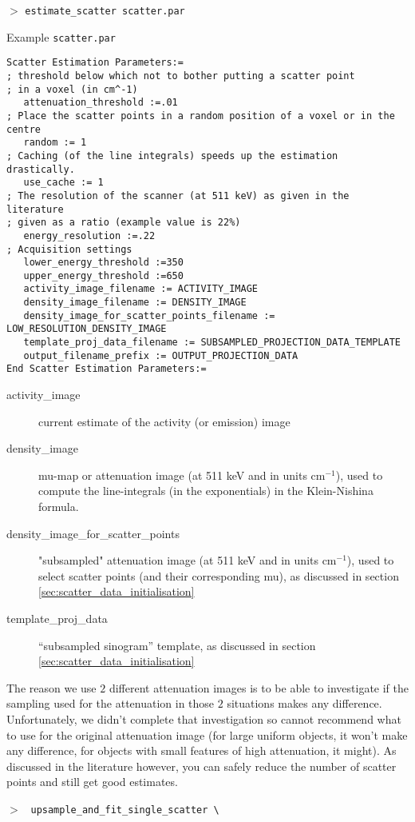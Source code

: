 \documentclass{article}
\newcommand{\cmdline}[1]{\par \noindent $>$ \texttt{#1}\par}
\begin{document}
{\cmdline{estimate\_scatter scatter.par}
Example \texttt{scatter.par}
\begin{verbatim}
Scatter Estimation Parameters:=
; threshold below which not to bother putting a scatter point
; in a voxel (in cm^-1)
   attenuation_threshold :=.01
; Place the scatter points in a random position of a voxel or in the centre
   random := 1
; Caching (of the line integrals) speeds up the estimation drastically.
   use_cache := 1
; The resolution of the scanner (at 511 keV) as given in the literature
; given as a ratio (example value is 22%)
   energy_resolution :=.22
; Acquisition settings
   lower_energy_threshold :=350
   upper_energy_threshold :=650
   activity_image_filename := ACTIVITY_IMAGE
   density_image_filename := DENSITY_IMAGE
   density_image_for_scatter_points_filename := LOW_RESOLUTION_DENSITY_IMAGE
   template_proj_data_filename := SUBSAMPLED_PROJECTION_DATA_TEMPLATE
   output_filename_prefix := OUTPUT_PROJECTION_DATA
End Scatter Estimation Parameters:=
\end{verbatim}
\begin{description}
\item[activity\_image]
current estimate of the activity (or emission) image
\item[density\_image] mu-map or attenuation image (at 511 keV and in units cm$^{-1}$),
used to compute the line-integrals (in the exponentials) in the Klein-Nishina formula.
\item[density\_image\_for\_scatter\_points] "subsampled" attenuation image (at 511 keV and in units cm${}^{-1}$), 
used to select scatter points (and their corresponding mu),
as discussed in section \ref{sec:scatter_data_initialisation}
\item[template\_proj\_data]
``subsampled sinogram'' template,
as discussed in section \ref{sec:scatter_data_initialisation}
\end{description}
The reason we use $2$ different attenuation images is to be able to investigate if the sampling used for
the attenuation in those $2$ situations makes any difference. Unfortunately, we didn't complete that
investigation so cannot recommend what to use for the original attenuation image (for large uniform
objects, it won't make any difference, for objects with small features of high attenuation, it might). 
As discussed in the literature however, you can safely reduce the number of scatter points and still get
good estimates. 
\\[1cm]
\cmdline{%
upsample\_and\_fit\_single\_scatter \textbackslash \\
}}
\end{document}

